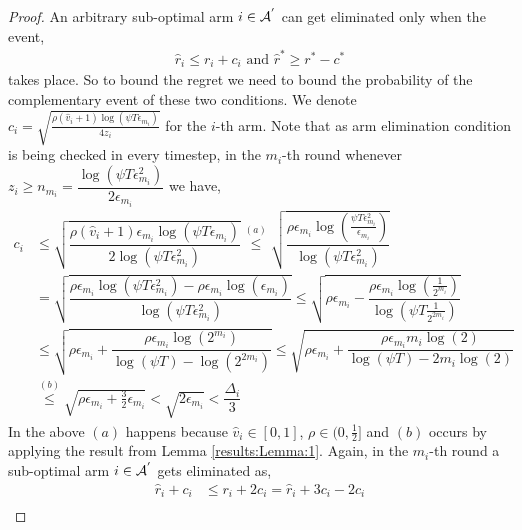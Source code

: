 \begin{proof}
An arbitrary sub-optimal arm ${i}\in \mathcal{A}^{'}$ can get eliminated only when the event,
	\begin{align}
	\hat{r}_{i} \leq r_{i} + c_{i} \text{ and } \label{eq:armelim-casea}
 	\hat{r}^{*} \geq r^{*} - c^{*}
	\end{align}
takes place. So to bound the regret we need to bound the probability of the complementary event of these two conditions. We denote $c_{i} = \sqrt{\frac{\rho (\hat{v}_i + 1) \log (\psi T\epsilon_{m_{i}})}{4 z_{i}}}$ for the $i$-th arm. Note that as arm elimination condition is being checked in every timestep, in the $m_i$-th round whenever $z_i\geq n_{m_{i}}=\dfrac{\log{(\psi T\epsilon_{m_{i}}^{2})}}{2\epsilon_{m_{i}}}$ we have, 
	\begin{align*}
	c_{i} &\leq \sqrt{\dfrac{\rho (\hat{v}_i + 1)\epsilon_{m_{i}}\log (\psi T\epsilon_{m_{i}})}{2\log(\psi T\epsilon_{m_{i}}^{2})}} \overset{(a)}{\leq} \sqrt{\dfrac{\rho\epsilon_{m_{i}}\log (\frac{\psi T\epsilon_{m_{i}}^{2}}{\epsilon_{m_{i}}})}{\log(\psi T\epsilon_{m_{i}}^{2})}} \\
	& = \sqrt{\dfrac{\rho\epsilon_{m_{i}}\log (\psi T\epsilon_{m_{i}}^{2}) - \rho\epsilon_{m_{i}}\log (\epsilon_{m_{i}})}{\log(\psi T\epsilon_{m_{i}}^{2})}} 
	\leq  \sqrt{\rho\epsilon_{m_{i}} - \dfrac{\rho\epsilon_{m_i}\log(\frac{1}{2^{m_i}})}{\log(\psi T \frac{1}{2^{2m_i}})}} \\
	&\leq \sqrt{\rho\epsilon_{m_{i}} + \dfrac{\rho\epsilon_{m_i}\log(2^{m_i})}{\log(\psi T) - \log( 2^{2m_i})}}  \leq \sqrt{\rho\epsilon_{m_{i}} + \dfrac{\rho\epsilon_{m_i}m_i \log(2)}{\log(\psi T) - 2m_i\log( 2)}} \\ 
	 & \overset{(b)}{\leq} \sqrt{\rho\epsilon_{m_{i}} + \frac{3}{2}\epsilon_{m_i}} 
	  < \sqrt{2\epsilon_{m_i}} 
	  < \dfrac{\Delta_{i}}{3} 
	\end{align*}
In the above $(a)$ happens because $\hat{v}_i \in [0,1]$, $\rho \in (0,\frac{1}{2}]$ and $(b)$ occurs by applying the result from Lemma \ref{results:Lemma:1}.
Again, in the $m_i$-th round a sub-optimal arm ${i} \in \mathcal{A}^{'}$ gets eliminated as, 
  \begin{align*}
\hat{r}_{i} + c_{i}&\leq r_{i} + 2c_{i} 
= \hat{r}_{i} + 3c_{i} - 2c_{i} \\

\end{align*}
\end{proof}
